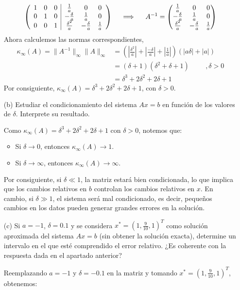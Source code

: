 \begin{homeworkProblem}
\begin{enumerate}
\begin{solucion}
\[
\left(
\begin{array}{ccc|ccc}
1 & 0 & 0 & \frac{1}{a} & 0 & 0 \\
0 & 1 & 0 & -\frac{\delta}{a} & \frac{1}{a} & 0 \\
0 & 0 & 1 & \frac{\delta^2}{a} & -\frac{\delta}{a} & \frac{1}{a}
\end{array}
\right)\hspace{0.5cm}\Longrightarrow \hspace{0.5cm}
A^{-1} =
\begin{pmatrix}
\frac{1}{a} & 0 & 0 \\
-\frac{\delta}{a} & \frac{1}{a} & 0 \\
\frac{\delta^2}{a} & -\frac{\delta}{a} & \frac{1}{a}
\end{pmatrix}
\]
Ahora calculemos las normas correspondientes,
\begin{align*}
    \kappa_\infty(A) = \|A^{-1}\|_\infty\|A\|_\infty &=\left(\left|\frac{\delta^2}{a}\right|+\left|\frac{-\delta}{a}\right|+\left|\frac{1}{a}\right|\right)\left(|a\delta|+|a|\right)\\
    &=(\delta+1)(\delta^2+\delta+1) \hspace{1cm},\delta>0\\
    &=\delta^3+2\delta^2+2\delta+1
\end{align*}
Por consiguiente, $\kappa_\infty(A)=\delta^3+2\delta^2+2\delta+1$, con $\delta>0$.  
    \end{solucion}
    
    \item[(b)] Estudiar el condicionamiento del sistema \( Ax = b \) en función de los valores de \( \delta \). Interprete su resultado.
    \begin{solucion}
      Como $\kappa_\infty(A) = \delta^3 + 2\delta^2 + 2\delta + 1$ con $\delta > 0$, notemos que:  
\begin{itemize}
    \item Si $\delta \rightarrow 0$, entonces $\kappa_\infty(A) \rightarrow 1$.  
    \item Si $\delta \rightarrow \infty$, entonces $\kappa_\infty(A) \rightarrow \infty$. 
\end{itemize}

Por consiguiente, si $\delta \ll 1$, la matriz estará bien condicionada, lo que implica que los cambios relativos en $b$ controlan los cambios relativos en $x$. En cambio, si $\delta \gg 1$, el sistema será mal condicionado, es decir, pequeños cambios en los datos pueden generar grandes errores en la solución.    
    \end{solucion}
    \item[(c)] Si \( a = -1 \), \( \delta = 0.1 \) y se considera $x^* =  \left(1, \frac{9}{10},  1 \right)^T$ como solución aproximada del sistema \( Ax = b \) (sin obtener la solución exacta), determine un intervalo en el que esté comprendido el error relativo. ¿Es coherente con la respuesta dada en el apartado anterior?
    \begin{solucion}
      Reemplazando $a=-1$ y $\delta=-0.1$ en la matriz y tomando $x^* =  \left(1, \frac{9}{10},  1 \right)^T$, obtenemos:


\end{solucion}
\end{enumerate}
\end{homeworkProblem}
